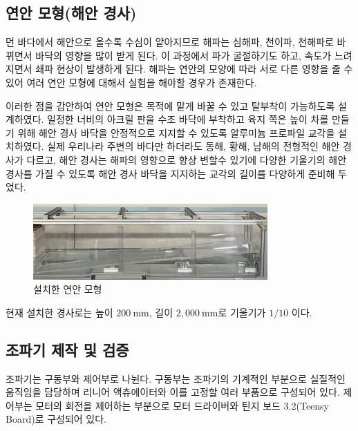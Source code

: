 \subsection{연안 모형(해안 경사)}

먼 바다에서 해안으로 올수록 수심이 얕아지므로 해파는 심해파, 천이파, 천해파로 바뀌면서 바닥의 영향을 많이 받게 된다. 이 과정에서 파가 굴절하기도 하고, 속도가 느려지면서 쇄파 현상이 발생하게 된다. 해파는 연안의 모양에 따라 서로 다른 영향을 줄 수 있어 여러 연안 모형에 대해서 실험을 해야할 경우가 존재한다.

이러한 점을 감안하여 연안 모형은 목적에 맡게 바꿀 수 있고 탈부착이 가능하도록 설계하였다. 일정한 너비의 아크릴 판을 수조 바닥에 부착하고 육지 쪽은 높이 차를 만들기 위해 해안 경사 바닥을 안정적으로 지지할 수 있도록 알루미늄 프로파일 교각을 설치하였다. 실제 우리나라 주변의 바다만 하더라도 동해, 황해, 남해의 전형적인 해안 경사가 다르고, 해안 경사는 해파의 영향으로 항상 변할수 있기에 다양한 기울기의 해안 경사를 가질 수 있도록 해안 경사 바닥을 지지하는 교각의 길이를 다양하게 준비해 두었다.

\begin{figure}[htbp]
	\begin{center}
		\includegraphics[width=0.8\textwidth]{images/slope.jpg}
		\caption{설치한 연안 모형}
		\label{Slope}
	\end{center}
\end{figure}
현재 설치한 경사로는 높이 $200\mathrm{~mm}$, 길이 $2,000\mathrm{~mm}$로 기울기가 $1/10$ 이다. 

\subsection{조파기 제작 및 검증}



조파기는 구동부와 제어부로 나뉜다. 구동부는 조파기의 기계적인 부분으로 실질적인 움직임을 담당하며 리니어 액츄에이터와 이를 고정할 여러 부품으로 구성되어 있다. 제어부는 모터의 회전을 제어하는 부분으로 모터 드라이버와 틴지 보드 3.2(Teensy Board)로 구성되어 있다.

